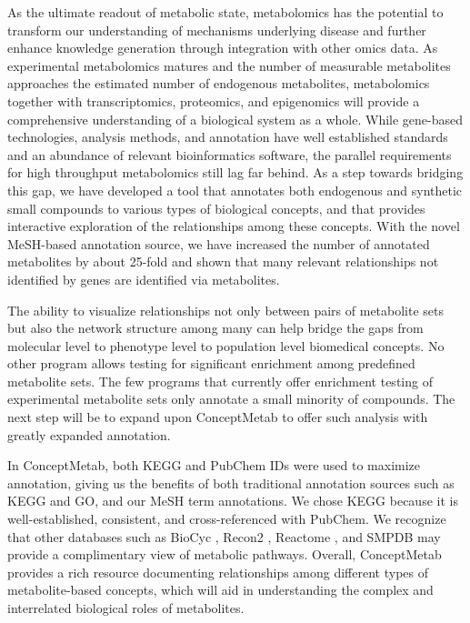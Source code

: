 As the ultimate readout of metabolic state, metabolomics has the potential to transform our understanding of mechanisms underlying disease and further enhance knowledge generation through integration with other omics data. As experimental metabolomics matures and the number of measurable metabolites approaches the estimated number of endogenous metabolites, metabolomics together with transcriptomics, proteomics, and epigenomics will provide a comprehensive understanding of a biological system as a whole. While gene-based technologies, analysis methods, and annotation have well established standards and an abundance of relevant bioinformatics software, the parallel requirements for high throughput metabolomics still lag far behind. As a step towards bridging this gap, we have developed a tool that annotates both endogenous and synthetic small compounds to various types of biological concepts, and that provides interactive exploration of the relationships among these concepts. With the novel MeSH-based annotation source, we have increased the number of annotated metabolites by about 25-fold and shown that many relevant relationships not identified by genes are identified via metabolites.

The ability to visualize relationships not only between pairs of metabolite sets but also the network structure among many can help bridge the gaps from molecular level to phenotype level to population level biomedical concepts. No other program allows testing for significant enrichment among predefined metabolite sets. The few programs that currently offer enrichment testing of experimental metabolite sets only annotate a small minority of compounds. The next step will be to expand upon ConceptMetab to offer such analysis with greatly expanded annotation.

In ConceptMetab, both KEGG and PubChem IDs were used to maximize annotation, giving us the benefits of both traditional annotation sources such as KEGG and GO, and our MeSH term annotations. We chose KEGG because it is well-established, consistent, and cross-referenced with PubChem. We recognize that other databases such as BioCyc \cite{Caspi:2013je}, Recon2 \cite{Thiele:2013jd}, Reactome \cite{Croft:2014iq}, and SMPDB \cite{Jewison:2014gc} may provide a complimentary view of metabolic pathways. Overall, ConceptMetab provides a rich resource documenting relationships among different types of metabolite-based concepts, which will aid in understanding the complex and interrelated biological roles of metabolites.
